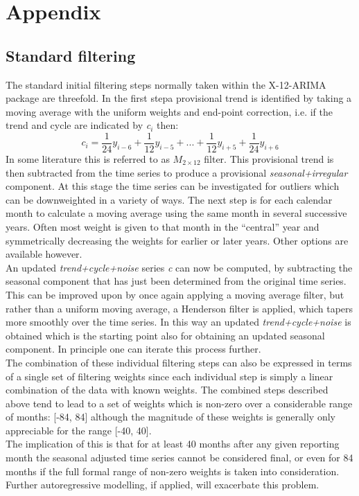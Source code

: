 \documentclass[english,blauw]{cbsdiscussionpaper}
\begin{document}
 \section*{Appendix}
 \subsection*{Standard filtering}
The standard initial filtering steps normally taken within the X-12-ARIMA package are threefold. In the first stepa provisional trend is identified by taking a moving average with the uniform weights and end-point correction, i.e. if the trend and cycle are indicated by \textit{c$_i$} then:
\begin{equation*}
c_i=\frac{1}{24}y_{i-6}+\frac{1}{12}y_{i-5}+...+\frac{1}{12}y_{i+5}+\frac{1}{24}y_{i+6}
\end{equation*}
In some literature this is referred to as $M_{2\times12}$ filter. This provisional trend is then subtracted from the time series to produce a provisional \textit{seasonal+irregular} component. At this stage the time series can be investigated for outliers which can be downweighted in a variety of ways. The next step is for each calendar month to calculate a moving average using the same month in several successive years. Often most weight is given to that month in the ``central'' year and symmetrically decreasing the weights for earlier or later years. Other options are available however.\\An updated \textit{trend+cycle+noise} series \textit{c} can now be computed, by subtracting the seasonal component that has just been determined from the original time series. This can be improved upon by once again applying a moving average filter, but rather than a uniform moving average, a Henderson filter is applied, which tapers more smoothly over the time series. In this way an updated \textit{trend+cycle+noise} is obtained which is the starting point also for obtaining an updated seasonal component. In principle one can iterate this process further.\\The combination of these individual filtering steps can also be expressed in terms of a single set of filtering weights since each individual step is simply a linear combination of the data with known weights. The combined steps described above tend to lead to a set of weights which is non-zero over a considerable range of months: [-84, 84] although the magnitude of these weights is generally only appreciable for the range [-40, 40].\\The implication of this is that for at least 40 months after any given reporting month the seasonal adjusted time series cannot be considered final, or even for 84 months if the full formal range of non-zero weights is taken into consideration. Further autoregressive modelling, if applied, will exacerbate this problem.
\end{document}
